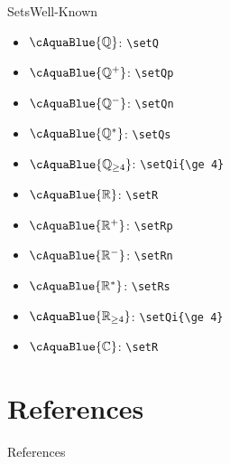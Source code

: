\documentclass[aspectratio=169, sectionpages]{beamer}
\begin{document}
\begin{frame}[fragile]{Sets}{Well-Known}
	\begin{minipage}[t]{0.3\textwidth}
		\vspace{0pt}
		\begin{itemize}
			\item \(\cAquaBlue{ \setQ } \): \verb!\setQ!
			\item \(\cAquaBlue{ \setQp } \): \verb!\setQp!
			\item \(\cAquaBlue{ \setQn } \): \verb!\setQn!
			\item \(\cAquaBlue{ \setQs } \): \verb!\setQs!
			\item \(\cAquaBlue{ \setQi{\ge 4} } \): \verb!\setQi{\ge 4}!
			\item \(\cAquaBlue{ \setR } \): \verb!\setR!
			\item \(\cAquaBlue{ \setRp } \): \verb!\setRp!
			\item \(\cAquaBlue{ \setRn } \): \verb!\setRn!
			\item \(\cAquaBlue{ \setRs } \): \verb!\setRs!
			\item \(\cAquaBlue{ \setRi{\ge 4} } \): \verb!\setQi{\ge 4}!
			\item \(\cAquaBlue{ \setC } \): \verb!\setR!
		\end{itemize}
	\end{minipage}
	\hfill

\end{frame}

\section{References}

\begin{frame}[allowframebreaks]{References}
	\printbibliography[title={References}]%
\end{frame}
\end{document}
